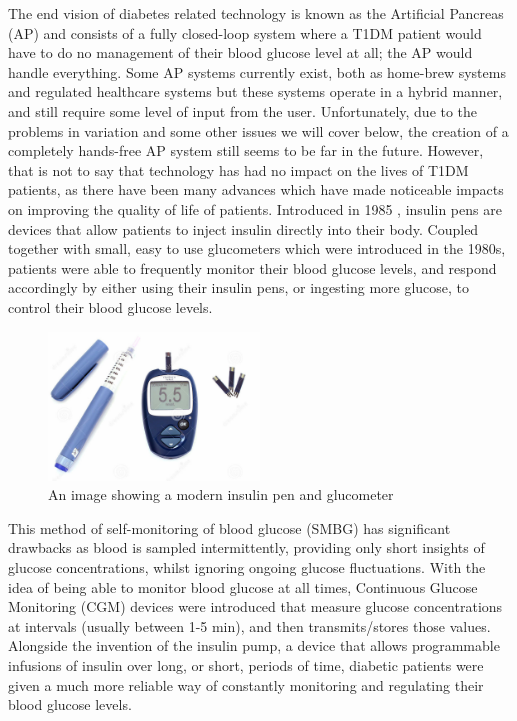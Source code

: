     The end vision of diabetes related technology is known as the Artificial Pancreas (AP) and consists of a fully closed-loop system where a T1DM patient would have to do no management of their blood glucose level at all; the AP would handle everything. Some AP systems currently exist, both as home-brew systems and regulated healthcare systems \cite{apsystems} but these systems operate in a hybrid manner, and still require some level of input from the user. Unfortunately, due to the problems in variation and some other issues we will cover below, the creation of a completely hands-free AP system still seems to be far in the future. However, that is not to say that technology has had no impact on the lives of T1DM patients, as there have been many advances which have made noticeable impacts on improving the quality of life of patients. Introduced in 1985 \cite{diatech}, insulin pens are devices that allow patients to inject insulin directly into their body. Coupled together with small, easy to use glucometers which were introduced in the 1980s, patients were able to frequently monitor their blood glucose levels, and respond accordingly by either using their insulin pens, or ingesting more glucose, to control their blood glucose levels. \begin{figure}[H]
        \centering
        \includegraphics[width=0.5\textwidth]{images/glucometer.jpg}
        \caption{
         An image showing a modern insulin pen and glucometer \cite{penandglucometer}
        }
    \end{figure}
    This method of self-monitoring of blood glucose (SMBG) has significant drawbacks as blood is sampled intermittently, providing only short insights of glucose concentrations, whilst ignoring ongoing glucose fluctuations. With the idea of being able to monitor blood glucose at all times, Continuous Glucose Monitoring (CGM) devices were introduced that measure glucose concentrations at intervals (usually between 1-5 min), and then transmits/stores those values. Alongside the invention of the insulin pump, a device that allows programmable infusions of insulin over long, or short, periods of time, diabetic patients were given a much more reliable way of constantly monitoring and regulating their blood glucose levels.
